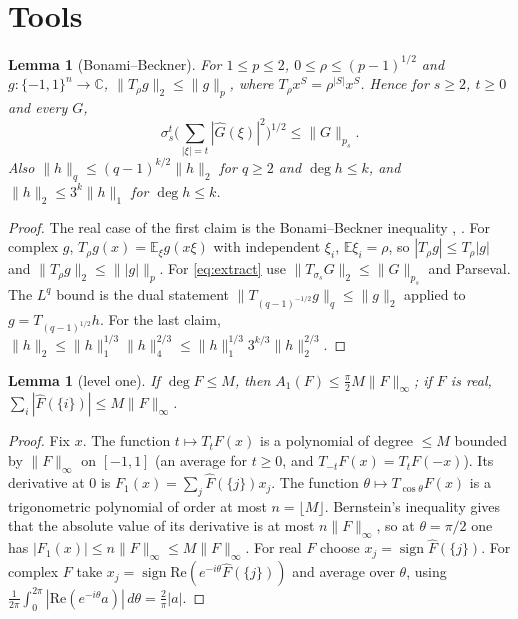 \documentclass[11pt]{amsart}
\newtheorem{lemma}[theorem]{Lemma}
\theoremstyle{definition}
\newcommand{\C}{\mathbb{C}}
\newcommand{\E}{\mathbb{E}}
\begin{document}
\section{Tools}\label{sec:tools}

\begin{lemma}[Bonami--Beckner]\label{lem:bonami}
For $1\le p\le2$, $0\le\rho\le(p-1)^{1/2}$ and $g:\{-1,1\}^n\to\C$, $\|T_\rho g\|_2\le\|g\|_p$, where $T_\rho x^S=\rho^{|S|}x^S$. Hence for $s\ge2$, $t\ge0$ and every $G$,
\begin{equation}\label{eq:extract}
\sigma_s^t\Big(\sum_{|\xi|=t}|\widehat G(\xi)|^2\Big)^{1/2}\le\|G\|_{p_s}.
\end{equation}
Also $\|h\|_q\le(q-1)^{k/2}\|h\|_2$ for $q\ge2$ and $\deg h\le k$, and $\|h\|_2\le 3^{k}\|h\|_1$ for $\deg h\le k$.
\end{lemma}

\begin{proof}
The real case of the first claim is the Bonami--Beckner inequality \cite{Bon70,Bec75}, \cite[Ch.~9]{OD}. For complex $g$, $T_\rho g(x)=\E_\xi g(x\xi)$ with independent $\xi_i$, $\E\xi_i=\rho$, so $|T_\rho g|\le T_\rho|g|$ and $\|T_\rho g\|_2\le\||g|\|_p$. For \eqref{eq:extract} use $\|T_{\sigma_s}G\|_2\le\|G\|_{p_s}$ and Parseval. The $L^q$ bound is the dual statement $\|T_{(q-1)^{-1/2}}g\|_q\le\|g\|_2$ applied to $g=T_{(q-1)^{1/2}}h$. For the last claim, $\|h\|_2\le\|h\|_1^{1/3}\|h\|_4^{2/3}\le\|h\|_1^{1/3}3^{k/3}\|h\|_2^{2/3}$.
\end{proof}

\begin{lemma}[level one]\label{lem:level1}
If $\deg F\le M$, then $A_1(F)\le\frac\pi2M\|F\|_\infty$; if $F$ is real, $\sum_i|\widehat F(\{i\})|\le M\|F\|_\infty$.
\end{lemma}

\begin{proof}
Fix $x$. The function $t\mapsto T_tF(x)$ is a polynomial of degree $\le M$ bounded by $\|F\|_\infty$ on $[-1,1]$ (an average for $t\ge0$, and $T_{-t}F(x)=T_tF(-x)$). Its derivative at $0$ is $F_1(x)=\sum_j\widehat F(\{j\})x_j$. The function $\theta\mapsto T_{\cos\theta}F(x)$ is a trigonometric polynomial of order at most $n=\lfloor M\rfloor$. Bernstein's inequality \cite[p.~98]{DL} gives that the absolute value of its derivative is at most $n\|F\|_\infty$, so at $\theta=\pi/2$ one has $|F_1(x)|\le n\|F\|_\infty\le M\|F\|_\infty$. For real $F$ choose $x_j=\operatorname{sign}\widehat F(\{j\})$. For complex $F$ take $x_j=\operatorname{sign}\mathrm{Re}(e^{-i\theta}\widehat F(\{j\}))$ and average over $\theta$, using $\frac1{2\pi}\int_0^{2\pi}|\mathrm{Re}(e^{-i\theta}a)|\,d\theta=\frac2\pi|a|$.
\end{proof}
\end{document}
